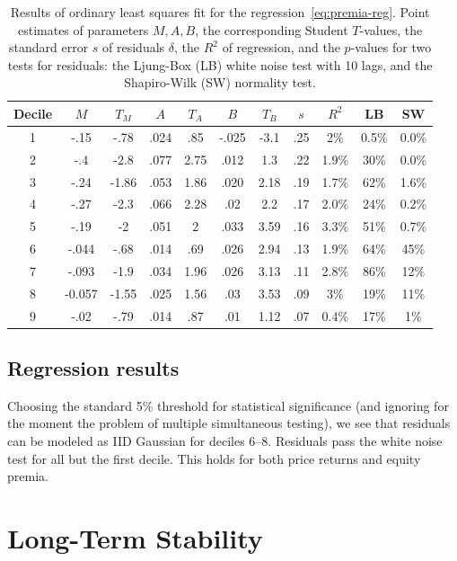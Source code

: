 \documentclass[12pt]{amsart}
\begin{document}
\begin{table}
\begin{tabular}{|c|c|c|c|c|c|c|c|c|c|c|}
\hline
Decile & $M$ & $T_M$ & $A$ & $T_A$ & $B$ & $T_B$ & $s$  & $R^2$ & LB & SW\\
\hline
1 & -.15 & -.78 & .024 & .85 & -.025 & -3.1 & .25 & 2\% & 0.5\% & 0.0\%\\
\hline
2 & -.4 & -2.8 & .077 & 2.75 & .012 & 1.3 & .22 & 1.9\% & 30\% & 0.0\%\\
\hline
3 & -.24 & -1.86 & .053 & 1.86 & .020 & 2.18 & .19 & 1.7\% & 62\% & 1.6\%\\
\hline
4 & -.27 & -2.3 & .066 & 2.28 & .02 & 2.2 & .17 & 2.0\% & 24\% & 0.2\% \\
\hline
5 & -.19 & -2 & .051 & 2 & .033 & 3.59 & .16 & 3.3\% & 51\% & 0.7\%\\
\hline
6 & -.044 & -.68 & .014 & .69 & .026 & 2.94 & .13 & 1.9\% & 64\% & 45\%\\
\hline
7 & -.093 & -1.9 & .034 & 1.96 & .026 & 3.13 & .11 & 2.8\% & 86\% & 12\%\\
\hline
8 & -0.057 & -1.55 & .025 & 1.56 & .03 & 3.53 & .09 & 3\% & 19\% & 11\%\\
\hline
9 & -.02 & -.79 & .014 & .87 & .01 & 1.12 & .07& 0.4\% & 17\% & 1\% \\
\hline
\end{tabular}
\bigskip
\caption{Results of ordinary least squares fit for the regression~\eqref{eq:premia-reg}. Point estimates of parameters $M, A, B$, the corresponding Student $T$-values, the standard error $s$ of residuals $\delta$, the $R^2$ of regression, and the $p$-values for two tests for residuals: the Ljung-Box (LB) white noise test with 10 lags, and the Shapiro-Wilk (SW) normality test.}
\label{table:premia}
\end{table}

\subsection{Regression results} Choosing the standard 5\% threshold for statistical significance (and ignoring for the moment the problem of multiple simultaneous testing), we see that residuals can be modeled as IID Gaussian for deciles 6--8. Residuals pass the white noise test for all but the first decile. This holds for both price returns and equity premia. 

\section{Long-Term Stability} 
\end{document}

